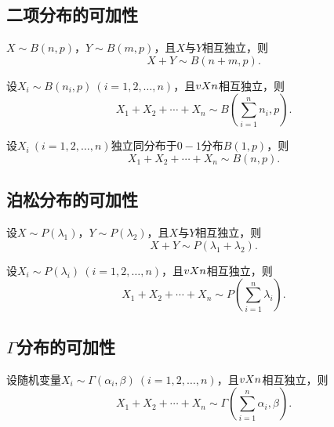 \subsection{二项分布的可加性}
\begin{theorem}\label{theorem:多维随机变量及其分布.二项分布的可加性1}
\(X \sim B(n,p)\)，\(Y \sim B(m,p)\)，且\(X\)与\(Y\)相互独立，则\[
X+Y \sim B(n+m,p).
\]
\end{theorem}

\begin{corollary}\label{theorem:多维随机变量及其分布.二项分布的可加性2}
设\(X_i \sim B(n_i,p)\ (i=1,2,\dotsc,n)\)，且\(v{X}{n}\)相互独立，则\[
X_1+X_2+\dotsb+X_n \sim B\left(\sum\limits_{i=1}^n n_i,p\right).
\]
\end{corollary}

\begin{corollary}\label{theorem:多维随机变量及其分布.二项分布的可加性3}
设\(X_i\ (i=1,2,\dotsc,n)\)独立同分布于\(0-1\)分布\(B(1,p)\)，则\[
X_1+X_2+\dotsb+X_n \sim B(n,p).
\]
\end{corollary}

\subsection{泊松分布的可加性}
\begin{theorem}\label{theorem:多维随机变量及其分布.泊松分布的可加性1}
设\(X \sim P(\lambda_1)\)，\(Y \sim P(\lambda_2)\)，且\(X\)与\(Y\)相互独立，则\[
X+Y \sim P(\lambda_1 + \lambda_2).
\]
\end{theorem}

\begin{corollary}\label{theorem:多维随机变量及其分布.泊松分布的可加性2}
设\(X_i \sim P(\lambda_i)\ (i=1,2,\dotsc,n)\)，且\(v{X}{n}\)相互独立，则\[
X_1+X_2+\dotsb+X_n \sim P\left(\sum\limits_{i=1}^n{\lambda_i}\right).
\]
\end{corollary}

\subsection{\texorpdfstring{\(\Gamma\)分布的可加性}{伽马分布的可加性}}
\begin{theorem}\label{theorem:多维随机变量及其分布.伽马分布的可加性1}
设随机变量\(X_i \sim \Gamma(\alpha_i,\beta)\ (i=1,2,\dotsc,n)\)，且\(v{X}{n}\)相互独立，则\[
X_1+X_2+\dotsb+X_n \sim \Gamma\left(\sum\limits_{i=1}^n{\alpha_i},\beta\right).
\]
\end{theorem}

